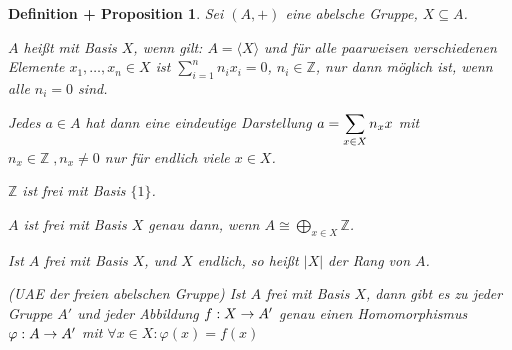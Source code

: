 \documentclass[a4paper,10pt,german]{scrbook}
\theoremstyle{saetze}
\theoremstyle{definitionen}
\newtheorem{DefProp}[Def]{Definition + Proposition}
\begin{document}
\begin{DefProp}
    \label{1.18}
    Sei $(A,+)$ eine abelsche Gruppe, $X \subseteq A$.
    \begin{enum}
        \item $A$ heißt  mit Basis $X$, wenn gilt: $A=\langle X\rangle$ und für alle paarweisen verschiedenen Elemente $x_1,\ldots,x_n\in X$ ist $\sum_{i=1}^n n_i x_i = 0$, $n_i \in \mathbb Z$, nur dann möglich ist, wenn alle $n_i=0$ sind.
	
	Jedes $a \in A$ hat dann eine eindeutige Darstellung $\displaystyle a = \sum_{x\in X} n_x x$ mit
        $n_x \in \mathbb{Z}\;, n_x \neq 0$ nur für endlich viele $x \in X$.
	

	\item $\mathbb Z$ ist frei mit Basis $\{1\}$.

	\item $A$ ist frei mit Basis $X$ genau dann, wenn $A \cong \bigoplus_{x\in X}\mathbb Z$.
	\item Ist $A$ frei mit Basis $X$, und $X$ endlich, so heißt $|X|$ der Rang von $A$.

        \item (UAE der freien abelschen Gruppe) \newline
        Ist $A$ frei mit Basis $X$, dann gibt es zu jeder Gruppe $A'$ und jeder Abbildung $f:X \rightarrow A'$
        genau einen Homomorphismus $\varphi: A\rightarrow A'$ mit $\forall x
        \in X: \varphi(x) = f(x)$ \newline
    \end{enum}



\end{DefProp} 
\end{document}
